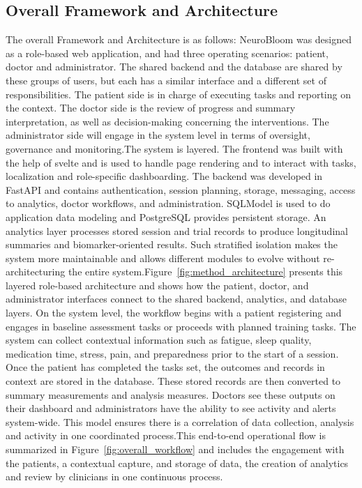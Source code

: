 \documentclass[12pt,a4paper]{report}
\begin{document}
\subsection{Overall Framework and Architecture}
The overall Framework and Architecture is as follows:
NeuroBloom was designed as a role-based web application, and had three operating scenarios: patient, doctor and administrator. The shared backend and the database are shared by these groups of users, but each has a similar interface and a different set of responsibilities. The patient side is in charge of executing tasks and reporting on the context. The doctor side is the review of progress and summary interpretation, as well as decision-making concerning the interventions. The administrator side will engage in the system level in terms of oversight, governance and monitoring.The system is layered. The frontend was built with the help of svelte and is used to handle page rendering and to interact with tasks, localization and role-specific dashboarding. The backend was developed in FastAPI and contains authentication, session planning, storage, messaging, access to analytics, doctor workflows, and administration. SQLModel is used to do application data modeling and PostgreSQL provides persistent storage. An analytics layer processes stored session and trial records to produce longitudinal summaries and biomarker-oriented results. Such stratified isolation makes the system more maintainable and allows different modules to evolve without re-architecturing the entire system.Figure~\ref{fig:method_architecture} presents this layered role-based architecture and shows how the patient, doctor, and administrator interfaces connect to the shared backend, analytics, and database layers.
On the system level, the workflow begins with a patient registering and engages in baseline assessment tasks or proceeds with planned training tasks. The system can collect contextual information such as fatigue, sleep quality, medication time, stress, pain, and preparedness prior to the start of a session. Once the patient has completed the tasks set, the outcomes and records in context are stored in the database. These stored records are then converted to summary measurements and analysis measures. Doctors see these outputs on their dashboard and administrators have the ability to see activity and alerts system-wide. This model ensures there is a correlation of data collection, analysis and activity in one coordinated process.This end-to-end operational flow is summarized in Figure~\ref{fig:overall_workflow} and includes the engagement with the patients, a contextual capture, and storage of data, the creation of analytics and review by clinicians in one continuous process.
\end{document}
